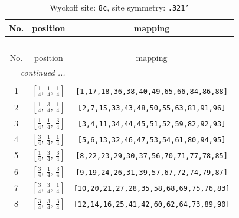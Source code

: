 \documentclass[fleqn,8pt]{jsarticle}
\begin{document}
\begin{longtable}{ccc}
\caption{Wyckoff site: {\tt 8c}, site symmetry: {\tt .321'}}
 \\
 \hline \hline
No. & position & mapping \\ \hline \endfirsthead

\multicolumn{2}{l}{\tablename\ \thetable{}} \\
 \hline \hline
No. & position & mapping \\ \hline \endhead

 \hline \hline
\multicolumn{2}{r}{\footnotesize\it continued ...} \\ \endfoot

 \hline \hline
\multicolumn{2}{r}{} \\ \endlastfoot

1 & $\left[ \frac{1}{4},\, \frac{1}{4},\, \frac{1}{4} \right]$ & {\tt [1,17,18,36,38,40,49,65,66,84,86,88]} \\ \hline
2 & $\left[ \frac{1}{4},\, \frac{3}{4},\, \frac{1}{4} \right]$ & {\tt [2,7,15,33,43,48,50,55,63,81,91,96]} \\ \hline
3 & $\left[ \frac{1}{4},\, \frac{1}{4},\, \frac{3}{4} \right]$ & {\tt [3,4,11,34,44,45,51,52,59,82,92,93]} \\ \hline
4 & $\left[ \frac{3}{4},\, \frac{1}{4},\, \frac{1}{4} \right]$ & {\tt [5,6,13,32,46,47,53,54,61,80,94,95]} \\ \hline
5 & $\left[ \frac{1}{4},\, \frac{3}{4},\, \frac{3}{4} \right]$ & {\tt [8,22,23,29,30,37,56,70,71,77,78,85]} \\ \hline
6 & $\left[ \frac{3}{4},\, \frac{1}{4},\, \frac{3}{4} \right]$ & {\tt [9,19,24,26,31,39,57,67,72,74,79,87]} \\ \hline
7 & $\left[ \frac{3}{4},\, \frac{3}{4},\, \frac{1}{4} \right]$ & {\tt [10,20,21,27,28,35,58,68,69,75,76,83]} \\ \hline
8 & $\left[ \frac{3}{4},\, \frac{3}{4},\, \frac{3}{4} \right]$ & {\tt [12,14,16,25,41,42,60,62,64,73,89,90]} \\
\end{longtable}
\renewcommand{\arraystretch}{1.2}
\end{document}
